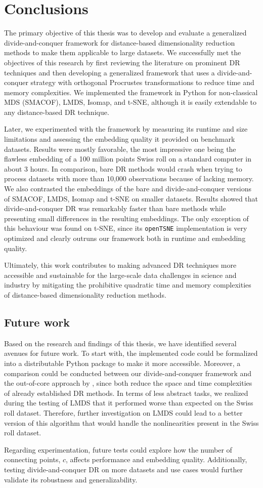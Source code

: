 \section{Conclusions}

The primary objective of this thesis was to develop and evaluate a generalized divide-and-conquer framework for distance-based dimensionality reduction methods to make them applicable to large datasets. We successfully met the objectives of this research by first reviewing the literature on prominent DR techniques and then developing a generalized framework that uses a divide-and-conquer strategy with orthogonal Procrustes transformations to reduce time and memory complexities. We implemented the framework in Python for non-classical MDS (SMACOF), LMDS, Isomap, and t-SNE, although it is easily extendable to any distance-based DR technique.

Later, we experimented with the framework by measuring its runtime and size limitations and assessing the embedding quality it provided on benchmark datasets. Results were mostly favorable, the most impressive one being the flawless embedding of a 100 million points Swiss roll on a standard computer in about 3 hours. In comparison, bare DR methods would crash when trying to process datasets with more than 10,000 observations because of lacking memory. We also contrasted the embeddings of the bare and divide-and-conquer versions of SMACOF, LMDS, Isomap and t-SNE on smaller datasets. Results showed that divide-and-conquer DR was remarkably faster than bare methods while presenting small differences in the resulting embeddings. The only exception of this behaviour was found on t-SNE, since its \verb|openTSNE| implementation is very optimized and clearly outruns our framework both in runtime and embedding quality.

Ultimately, this work contributes to making advanced DR techniques more accessible and sustainable for the large-scale data challenges in science and industry by mitigating the prohibitive quadratic time and memory complexities of distance-based dimensionality reduction methods.

\subsection{Future work}

Based on the research and findings of this thesis, we have identified several avenues for future work. To start with, the implemented code could be formalized into a distributable Python package to make it more accessible. Moreover, a comparison could be conducted between our divide-and-conquer framework and the out-of-core approach by \citet{Reichmann2024}, since both reduce the space and time complexities of already established DR methods. In terms of less abstract tasks, we realized during the testing of LMDS that it performed worse than expected on the Swiss roll dataset. Therefore, further investigation on LMDS could lead to a better version of this algorithm that would handle the nonlinearities present in the Swiss roll dataset.

Regarding experimentation, future tests could explore how the number of connecting points, $c$, affects performance and embedding quality. Additionally, testing divide-and-conquer DR on more datasets and use cases would further validate its robustness and generalizability.